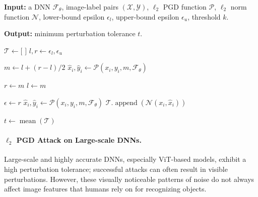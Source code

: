 \documentclass{article}
\theoremstyle{plain}
\theoremstyle{definition}
\theoremstyle{remark}
\begin{document}
\begin{algorithm}[t]
\textbf{Input:} {
\hspace*{0.1em} a DNN $\mathcal{F}_{\theta}$, image-label pairs $(\mathcal{X}, \mathcal{Y})$, $\ell_2$ PGD function $\mathcal{P}$, $\ell_2$ norm function $\mathcal{N}$, \newline
\hspace*{3.5em} lower-bound epsilon ${\epsilon}_{l}$, upper-bound epsilon ${\epsilon}_{u}$, threshold $k$.}

\textbf{Output:} {minimum perturbation tolerance $t$.}

\begin{algorithmic}
\State $\mathcal{T} \gets \text{[\ ]}$
    \State $l, r \gets {\epsilon}_{l}, {\epsilon}_{u}$

        \State $m \gets l + (r - l) / 2$ 
        \State $\hat{x}_i, \hat{y}_i \gets \mathcal{P}(x_i, y_i, m, \mathcal{F}_{\theta})$
        
            \State $r \gets m$ 
        \Else 
            \State $l \gets m$ 
        \EndIf
    \EndWhile
    
    \State $\epsilon \gets r$
    \State $\hat{x}_i, \hat{y}_i \gets \mathcal{P}(x_i, y_i, m, \mathcal{F}_{\theta})$
    \State $\mathcal{T}.\operatorname{append}(\mathcal{N}(x_i, \hat{x}_i))$
\EndFor

\State $t \gets \operatorname{mean}(\mathcal{T})$

\State {}

\end{algorithmic}
\caption{\label{alg:mpt}Find the minimum perturbation tolerance of an DNN model.}
\end{algorithm}


\paragraph{$\ell_2$ PGD Attack on Large-scale DNNs.}\label{si_sec:l2_large_dnn}

Large-scale and highly accurate DNNs, especially ViT-based models, exhibit a high perturbation tolerance; successful attacks can often result in visible perturbations. However, these visually noticeable patterns of noise do not always affect image features that humans rely on for recognizing objects.
\end{document}
